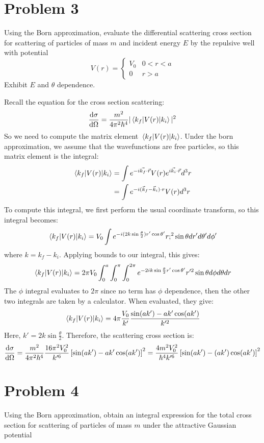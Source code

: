 \documentclass[10pt]{article}
\begin{document}
	\section*{Problem 3}

	Using the Born approximation, evaluate the differential scattering cross section for scattering of particles
	of mass $m$ and incident energy $E$ by the repulsive well with potential
	\[
	V(r) = \begin{cases}
		V_0 & 0 < r < a\\
		0 & r> a
	\end{cases}
	\]
	Exhibit $E$ and $\theta$ dependence. 

	\begin{solution}
		Recall the equation for the cross section scattering: 
		\[
			\dv{\sigma}{\Omega} = \frac{m^2}{4\pi^2 \hbar^4}|\mel{k_f}{V(r)}{k_i}|^2
		\] 
		So we need to compute the matrix element $\mel{k_f}{V(r)}{k_i}$. Under the born approximation, we assume
		that the wavefunctions are free particles, so this matrix element is the integral: 
		\begin{align*}
			\mel{k_f}{V(r)}{k_i} &= \int e^{-i \vec {k_f} \cdot \vec r} V(r) e^{i \vec{k_i}\cdot \vec r} d^3r \\
								 &= \int e^{-i(\vec k_f - \vec k_i) \cdot r}V(r) d^3r 
		\end{align*}
		To compute this integral, we first perform the usual coordinate transform, so this integral becomes: 
		\[
			\mel{k_f}{V(r)}{k_i} = V_0 \int e^{-i(2k \sin \frac{\theta}{2}) r' \cos \theta'} r;^2 \sin \theta 
			dr' d\theta' d\phi'
		\] 
		where $k = k_f - k_i$. Applying bounds to our integral, this gives: 
		\[
			\mel{k_f}{V(r)}{k_i} = 2\pi V_0 \int_0^a \int_0^\pi \int_0^{2\pi} e^{-2ik \sin \frac{\theta}{2}r' 
			\cos \theta'} r'^2 \sin \theta d\phi d\theta dr
		\] 
		The $\phi$ integral evaluates to $2\pi$ since no term has $\phi$ dependence, then the other two 
		integrals are taken by a calculator. When evaluated, they give:
		\[
			\mel{k_f}{V(r)}{k_i} = 4\pi \frac{V_0}{k'} \frac{\sin(ak') - ak' \cos (ak')}{k'^2}
		\] 
		Here, $k' = 2k \sin \frac{\theta}{2}$. Therefore, the scattering cross section is:
		\[
			\dv{\sigma}{\Omega} = \frac{m^2}{4\pi^2 \hbar^4} \frac{16 \pi^2 V_0^2}{k'^6}\left[\sin (ak') - 
			ak' \cos (ak')\right]^2 = \frac{4m^2V_0^2}{\hbar^4 k'^6}\left[\sin(ak') - (ak')\cos(ak')\right]^2
		\] 
	\end{solution}

	\pagebreak
	\section*{Problem 4}
	Using the Born approximation, obtain an integral expression for the total cross section for scattering of 
	particles of mass $m$ under the attractive Gaussian potential
\end{document}
